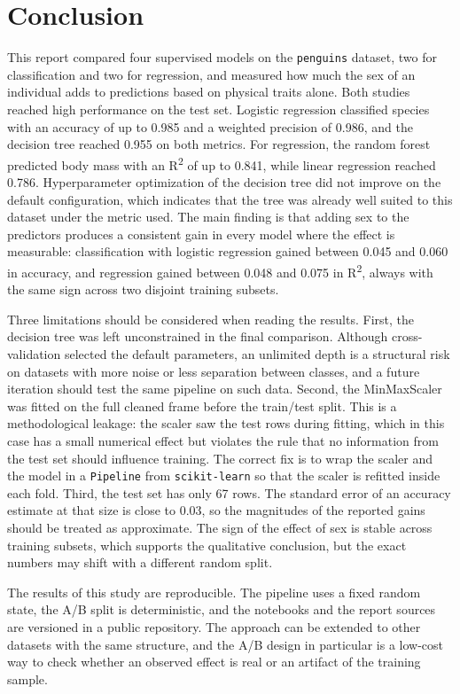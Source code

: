 \section{Conclusion}
\label{sec:conclusion}

This report compared four supervised models on the \texttt{penguins} dataset, two for classification and two for regression, and measured how much the sex of an individual adds to predictions based on physical traits alone. Both studies reached high performance on the test set. Logistic regression classified species with an accuracy of up to 0.985 and a weighted precision of 0.986, and the decision tree reached 0.955 on both metrics. For regression, the random forest predicted body mass with an R\textsuperscript{2} of up to 0.841, while linear regression reached 0.786. Hyperparameter optimization of the decision tree did not improve on the default configuration, which indicates that the tree was already well suited to this dataset under the metric used. The main finding is that adding sex to the predictors produces a consistent gain in every model where the effect is measurable: classification with logistic regression gained between 0.045 and 0.060 in accuracy, and regression gained between 0.048 and 0.075 in R\textsuperscript{2}, always with the same sign across two disjoint training subsets.

Three limitations should be considered when reading the results. First, the decision tree was left unconstrained in the final comparison. Although cross-validation selected the default parameters, an unlimited depth is a structural risk on datasets with more noise or less separation between classes, and a future iteration should test the same pipeline on such data. Second, the MinMaxScaler was fitted on the full cleaned frame before the train/test split. This is a methodological leakage: the scaler saw the test rows during fitting, which in this case has a small numerical effect but violates the rule that no information from the test set should influence training. The correct fix is to wrap the scaler and the model in a \texttt{Pipeline} from \texttt{scikit-learn} so that the scaler is refitted inside each fold. Third, the test set has only 67 rows. The standard error of an accuracy estimate at that size is close to 0.03, so the magnitudes of the reported gains should be treated as approximate. The sign of the effect of sex is stable across training subsets, which supports the qualitative conclusion, but the exact numbers may shift with a different random split.

The results of this study are reproducible. The pipeline uses a fixed random state, the A/B split is deterministic, and the notebooks and the report sources are versioned in a public repository. The approach can be extended to other datasets with the same structure, and the A/B design in particular is a low-cost way to check whether an observed effect is real or an artifact of the training sample.